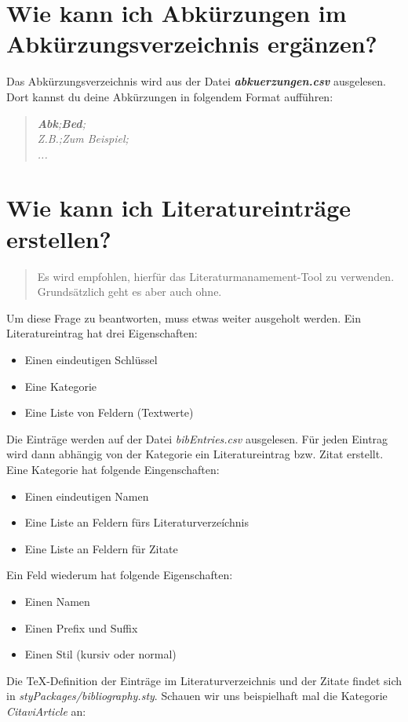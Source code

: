 \documentclass[12pt]{article}
\begin{document}
\section{Wie kann ich Abkürzungen im Abkürzungsverzeichnis ergänzen?}
Das Abkürzungsverzeichnis wird aus der Datei \textbf{\textit{abkuerzungen.csv}} ausgelesen. Dort kannst du deine Abkürzungen in folgendem Format aufführen:
\begin{quote}
\textit{\textbf{Abk};\textbf{Bed};}\\
\textit{Z.B.;Zum Beispiel;}\\
\textit{...}
\end{quote}

\section{Wie kann ich Literatureinträge erstellen?}
\begin{quote}
Es wird empfohlen, hierfür das Literaturmanamement-Tool zu verwenden. Grundsätzlich geht es aber auch ohne.
\end{quote}
Um diese Frage zu beantworten, muss etwas weiter ausgeholt werden. Ein Literatureintrag hat drei Eigenschaften:
\begin{itemize}
\item Einen eindeutigen Schlüssel
\item Eine Kategorie
\item Eine Liste von Feldern (Textwerte)
\end{itemize}
Die Einträge werden auf der Datei \textit{bibEntries.csv} ausgelesen. Für jeden Eintrag wird dann abhängig von der Kategorie ein Literatureintrag bzw. Zitat erstellt.\\
Eine Kategorie hat folgende Eingenschaften:
\begin{itemize}
\item Einen eindeutigen Namen
\item Eine Liste an Feldern fürs Literaturverzeíchnis
\item Eine Liste an Feldern für Zitate
\end{itemize}
Ein Feld wiederum hat folgende Eigenschaften:
\begin{itemize}
\item Einen Namen
\item Einen Prefix und Suffix
\item Einen Stil (kursiv oder normal)
\end{itemize}
Die TeX-Definition der Einträge im Literaturverzeichnis und der Zitate findet sich in \textit{styPackages/bibliography.sty}. Schauen wir uns beispielhaft mal die Kategorie \textit{CitaviArticle} an:
\end{document}
